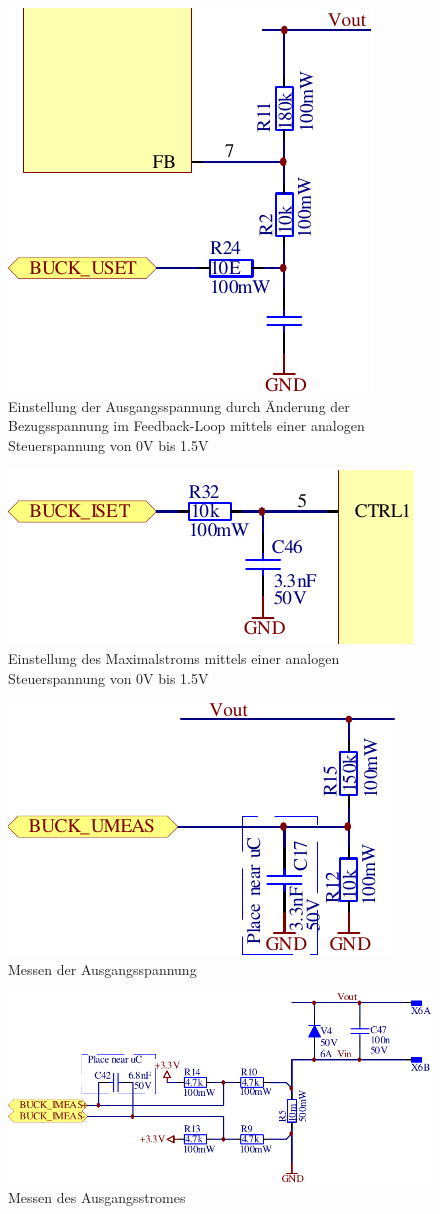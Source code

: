 \begin{figure}[H]
    \center
    \includegraphics[width=.35\textwidth]{images/circuit/buck-uset.pdf}
    \caption{Einstellung der Ausgangsspannung durch \"Anderung der Bezugsspannung im Feedback-Loop mittels einer analogen Steuerspannung von 0V bis 1.5V}
    \label{fig:circuit:buck:uset}
\end{figure}

\begin{figure}[H]
    \center
    \includegraphics[width=.4\textwidth]{images/circuit/buck-iset.pdf}
    \caption{Einstellung des Maximalstroms mittels einer analogen Steuerspannung von 0V bis 1.5V}
    \label{fig:circuit:buck:iset}
\end{figure}

\begin{figure}[H]
    \center
    \includegraphics[width=.45\textwidth]{images/circuit/buck-umeas.pdf}
    \caption{Messen der Ausgangsspannung}
    \label{fig:circuit:buck:umeas}
\end{figure}

\begin{figure}[H]
    \center
    \includegraphics[width=.85\textwidth]{images/circuit/buck-imeas.pdf}
    \caption{Messen des Ausgangsstromes}
    \label{fig:circuit:buck:imeas}
\end{figure}

